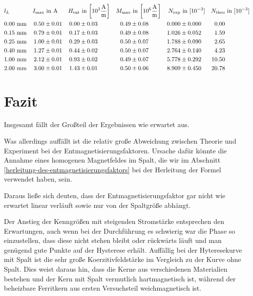 \documentclass[12pt,a4paper]{scrartcl}
\numberwithin{equation}{section} %
\renewcommand{\[}{} %
\renewcommand{\]}{\noindent} %
\begin{document}
\begin{table}
\begin{align*}
	&l_L &
		I_\mathrm{max} &\text{ in } \mathrm A &
		H_\mathrm{ent} &\text{ in }
		{\tiny \left[ 10^3 \frac{\mathrm A}{\mathrm m} \right] } &
		M_\mathrm{max} &\text{ in }
		{\tiny \left[ 10^6 \frac{\mathrm A}{\mathrm m} \right] } &
		N_\mathrm{exp} &\text{ in } [10^{-3}] &
		N_\mathrm{theo} &\text{ in } [10^{-3}]
		\\
	&0.00 \ \mathrm{mm} &
		0.50 &\pm 0.01 &
		0.00 &\pm 0.03 &
		0.49 &\pm 0.08 &
		0.000 &\pm 0.000 &
		0.00\\
	&0.15 \ \mathrm{mm} &
		0.79 &\pm 0.01 &
		0.17 &\pm 0.03 &
		0.49 &\pm 0.08 &
		1.026 &\pm 0.052 &
		1.59\\
	&0.25 \ \mathrm{mm} &
		1.00 &\pm 0.01 &
		0.29 &\pm 0.03 &
		0.50 &\pm 0.07 &
		1.788 &\pm 0.090 &
		2.65\\
	&0.40 \ \mathrm{mm} &
		1.27 &\pm 0.01 &
		0.44 &\pm 0.02 &
		0.50 &\pm 0.07 &
		2.764 &\pm 0.140 &
		4.23\\
	&1.00 \ \mathrm{mm} &
		2.12 &\pm 0.01 &
		0.93 &\pm 0.02 &
		0.49 &\pm 0.07 &
		5.778 &\pm 0.292 &
		10.50\\
	&2.00 \ \mathrm{mm} &
		3.00 &\pm 0.01 &
		1.43 &\pm 0.01 &
		0.50 &\pm 0.06 &
		8.909 &\pm 0.450 &
		20.78
\end{align*}
\caption{Entmagnetisierungsfaktor}
\label{Tab: Entmagnetisierung}
\end{table}

\clearpage
\hypertarget{fazit}{%
\section{Fazit}\label{fazit}}

Insgesamt fällt der Großteil der Ergebnissen wie erwartet aus.

Was allerdings auffällt ist die relativ große Abweichung zwischen Theorie und Experiment bei der Entmagnetisierungsfaktoren. Ursache dafür könnte die Annahme eines homogenen Magnetfeldes im Spalt, die wir im Abschnitt \ref{herleitung-des-entmagnetisierungsfaktors} bei der Herleitung der Formel verwendet haben, sein.

Daraus ließe sich deuten, dass der Entmagnetisierungsfaktor gar nicht wie erwartet linear verläuft sowie nur von der Spaltgröße abhängt.

Der Anstieg der Kenngrößen mit steigenden Stromstärke entsprechen den Erwartungen, auch wenn bei der Durchführung es schwierig war die Phase so einzustellen, dass diese nicht stehen bleibt oder rückwärts läuft und man genügend gute Punkte auf der Hysterese erhält. Auffällig bei der Hyteresekurve mit Spalt ist die sehr große Koerzitivfeldstärke im Vergleich zu der Kurve ohne Spalt. Dies weist daraus hin, dass die Kerne aus verschiedenen Materialien bestehen und der Kern mit Spalt vermutlich hartmagnetisch ist, während der beheizbare Ferritkern aus ersten Versuchsteil weichmagnetisch ist.
\end{document}
